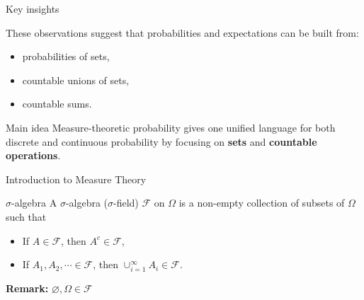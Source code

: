 \documentclass [aspectratio=169]{beamer}
\newcommand{\mc}{\mathcal}
\begin{document}
\begin{frame}{Key insights}

These observations suggest that probabilities and expectations can be built from:

\begin{itemize}
    \item probabilities of sets,
    \item countable unions of sets,
    \item countable sums.
\end{itemize}

\vspace{3mm}

\begin{block}{Main idea}
Measure-theoretic probability gives one unified language for both discrete and continuous probability by focusing on \textbf{sets} and \textbf{countable operations}.
\end{block}

\end{frame}

\begin{frame}{Introduction to Measure Theory}
    \begin{block}{$\sigma$-algebra}
  A $\sigma$-algebra ($\sigma$-field) $\mc{F}$ on $\Omega$ is a non-empty collection of subsets of $\Omega$ such that
    \begin{itemize}
        \item If $A \in \mc{F}$, then $A^c \in \mc{F}$, %
        \item If $A_1, A_2, \cdots \in \mc{F}$, then $\cup_{i = 1}^\infty A_i \in \mc{F}$. %
    \end{itemize}
    \end{block}
    \textbf{Remark:} $\varnothing, \Omega \in \mc{F}$
    \vspace{1.5in}
\end{frame}
\end{document}
